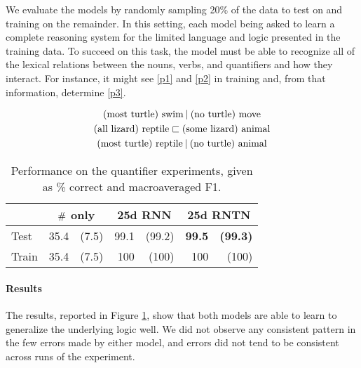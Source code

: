 
We evaluate the models by randomly sampling 20\% of the data to
test on and training on the remainder. In this setting, each model being asked to learn a
complete reasoning system for the limited language and logic presented
in the training data. To succeed on this task, the model must be able
to recognize all of the lexical relations between the nouns, verbs,
and quantifiers and how they interact. For instance, it might see
\eqref{p1} and \eqref{p2} in training and, from that information,
determine \eqref{p3}.

\vspace{-0.6cm}
\begin{gather}
  \text{(most turtle) swim} \mathbin{|} \text{(no turtle) move}\label{p1}
  \\
  \text{(all lizard) reptile} \sqsubset  \text{(some lizard) animal}\label{p2}
  \\
  \text{(most turtle) reptile} \mathbin{|} \text{(no turtle) animal}\label{p3}
\end{gather}\vspace{-0.8cm}

\begin{table}[tp]
  \centering \small
  \begin{tabular}{ l r@{ \ }r r@{ \ }r r@{ \ }r }
    \toprule
    ~&\multicolumn{2}{c}{$\mathbin{\#}$ only} & \multicolumn{2}{c}{25d RNN}  & \multicolumn{2}{c}{25d RNTN}\\
    \midrule
    Test & 35.4 &(7.5) &	99.1&(99.2)& \textbf{99.5} & \textbf{(99.3)}\\
    Train & 35.4 &(7.5) &	100&		(100)&	100&	(100)\\	
    \bottomrule
  \end{tabular}
  \caption{Performance on the quantifier experiments, given as \% correct and macroaveraged F1.}
  \label{qresultstable}
\end{table} 
%
%
\paragraph{Results} The results, reported in Figure \ref{qresultstable}, show that both models are able to learn to generalize the underlying logic well. We did not observe any consistent pattern in the few errors made by either model, and errors did not tend to be consistent across runs of the experiment.
